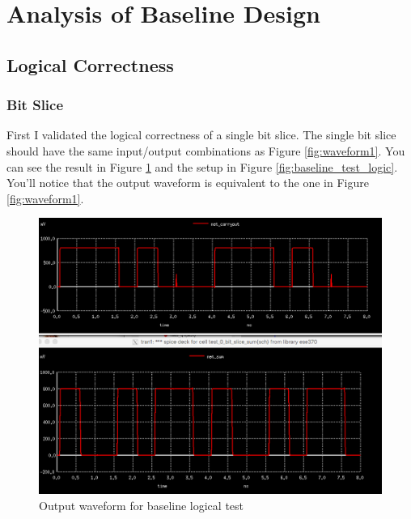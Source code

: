 \documentclass{article}
\begin{document}
\section{Analysis of Baseline Design}

\subsection{Logical Correctness}
\subsubsection{Bit Slice}
First I validated the logical correctness of a single bit slice. The single bit slice should have the same input/output combinations as Figure \ref{fig:waveform1}. You can see the result in Figure \ref{fig:waveform_baseline_test_logic} and the setup in Figure \ref{fig:baseline_test_logic}. You'll notice that the output waveform is equivalent to the one in Figure \ref{fig:waveform1}.

\begin{figure}[H]
  \includegraphics[width=\linewidth]{baseline_screenshots/baseline_test_logic_waveform.png}
  \caption{Output waveform for baseline logical test}
  \label{fig:waveform_baseline_test_logic}
\end{figure}
\end{document}
